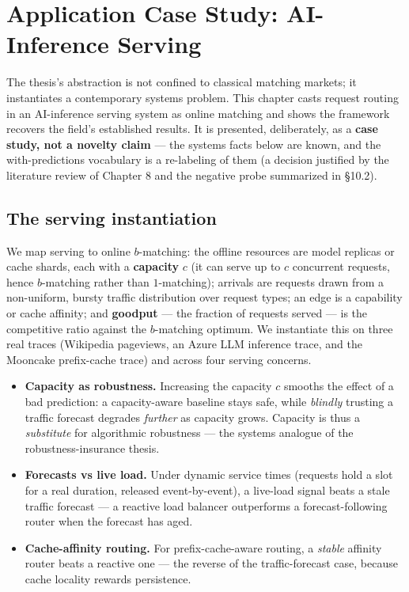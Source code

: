 \chapter{Application Case Study: AI-Inference Serving}\label{application-case-study-ai-inference-serving}

The thesis's abstraction is not confined to classical matching markets; it instantiates a
contemporary systems problem. This chapter casts request routing in an AI-inference serving
system as online matching and shows the framework recovers the field's established results.
It is presented, deliberately, as a \textbf{case study, not a novelty claim} --- the systems facts
below are known, and the with-predictions vocabulary is a re-labeling of them (a decision
justified by the literature review of Chapter 8 and the negative probe summarized in §10.2).

\section{The serving instantiation}\label{the-serving-instantiation}

We map serving to online \(b\)-matching: the offline resources are model replicas or cache
shards, each with a \textbf{capacity} \(c\) (it can serve up to \(c\) concurrent requests, hence
\(b\)-matching rather than \(1\)-matching); arrivals are requests drawn from a non-uniform,
bursty traffic distribution over request types; an edge is a capability or cache affinity;
and \textbf{goodput} --- the fraction of requests served --- is the competitive ratio against the
\(b\)-matching optimum. We instantiate this on three real traces (Wikipedia pageviews, an
Azure LLM inference trace, and the Mooncake prefix-cache trace) and across four serving
concerns.

\begin{itemize}
\tightlist
\item
  \textbf{Capacity as robustness.} Increasing the capacity \(c\) smooths the effect of a bad
  prediction: a capacity-aware baseline stays safe, while \emph{blindly} trusting a traffic
  forecast degrades \emph{further} as capacity grows. Capacity is thus a \emph{substitute} for
  algorithmic robustness --- the systems analogue of the robustness-insurance thesis.
\item
  \textbf{Forecasts vs live load.} Under dynamic service times (requests hold a slot for a real
  duration, released event-by-event), a live-load signal beats a stale traffic forecast --- a
  reactive load balancer outperforms a forecast-following router when the forecast has aged.
\item
  \textbf{Cache-affinity routing.} For prefix-cache-aware routing, a \emph{stable} affinity router
  beats a reactive one --- the reverse of the traffic-forecast case, because cache locality
  rewards persistence.
\end{itemize}

